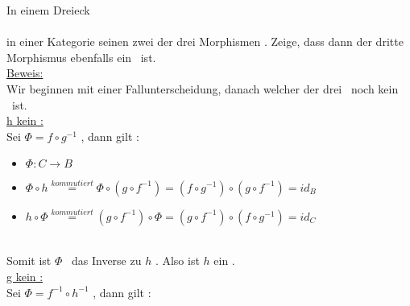 
In einem Dreieck 
	\\
	
	\\
	in einer Kategorie seinen zwei der drei Morphismen \Ison.
	Zeige, dass dann der dritte Morphismus ebenfalls ein \Iso \ ist.
	\\
	\underline{Beweis:} \\
		Wir beginnen mit einer Fallunterscheidung, danach welcher der drei \Morn \ noch kein \Iso \ ist.
		\\
		\underline{h kein \Iso :}
		\\
		Sei 
		\begin{math}
			\Phi=f \circ g^{-1}
		\end{math}		
		, dann gilt :
		\begin{itemize}
			\item 
				\begin{math}
					\Phi : C \to B
				\end{math}
			\item
				\begin{math}
					\Phi \circ h \overset{ kommutiert}{=}
					\Phi \circ \left( 
						g \circ f^{-1} 
						\right) =
					\left( f \circ g^{-1} \right) 
					\circ 
					\left( g \circ f^{-1} \right)= 
					id_{B}
				\end{math}
			\item
				\begin{math}
					h \circ \Phi \overset{ kommutiert}{=}
					\left( 
						g \circ f^{-1}
						\right) \circ \Phi =
					\left( g \circ f^{-1} \right)
					\circ
					\left( f \circ g^{-1} \right)=
					id_{C}
				\end{math}
		\end{itemize}
		\\
		Somit ist 
		\begin{math}
			\Phi
		\end{math}
		\ das Inverse zu 
		\begin{math}
			h
		\end{math}
		. 
		Also ist 
		\begin{math}
			h
		\end{math}
		ein \Iso. 
		\\
		\underline {g kein \Iso :}
		\\
		Sei 
		\begin{math}
			\Phi=f^{-1} \circ h^{-1}
		\end{math}		
		, dann gilt :
